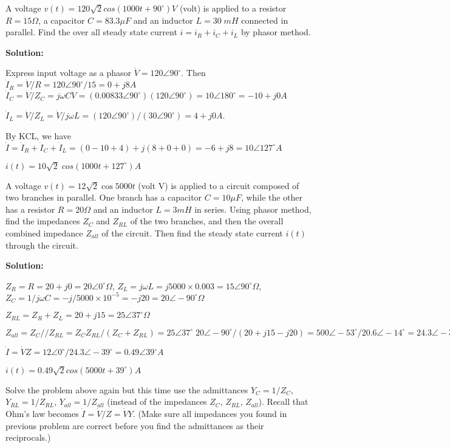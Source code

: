 \item A voltage $v(t)=120\sqrt{2} cos(1000t+90^\circ) V$ (volt) is applied to 
a resistor $R=15\Omega$, a capacitor $C=83.3\mu F$ and an inductor $L=30\; mH$ 
connected in parallel. Find the over all steady state current $i=i_R+i_C+i_L$ 
by phasor method.

{\bf Solution:}

Express input voltage as a phasor $\dot{V}=120\angle{90^\circ}$.  
Then $\dot{I}_R=\dot{V}/R=120\angle{90^\circ}/15=0+j8 A$
 $\dot{I}_C=\dot{V}/Z_C=j\omega C\dot{V}=(0.00833\angle 90^\circ)(120\angle{90^\circ})
 	=10\angle 180^\circ=-10+j0 A$

$\dot{I}_L=\dot{V}/Z_L=\dot{V}/j\omega L=(120\angle 90^\circ)/(30\angle{90^\circ})=4+j0 A$.

By KCL, we have $\dot{I}=\dot{I}_R+\dot{I}_C+\dot{I}_L=(0-10+4)+j(8+0+0)
  	=-6+j8=10\angle{127^\circ} A$

  $i(t)=10\sqrt{2}\;cos(1000t+127^\circ) A$

\item A voltage $v(t)=12\sqrt{2} \cos 5000 t$ (volt V) is applied to a circuit
composed of two branches in parallel. One branch has a capacitor $C=10\mu F$,
while the other has a resistor $R=20\Omega$ and an inductor $L=3 mH$ in series.
Using phasor method, find the impedances $Z_C$ and $Z_{RL}$ of the two branches,
and then the overall combined impedance $Z_{all}$ of the circuit. Then find
the steady state current $i(t)$ through the circuit.

{\bf Solution:}

$Z_R=R=20+j0=20\angle 0^\circ \Omega$, $Z_L=j\omega L=j5000\times 0.003
=15\angle 90^\circ \Omega$, $Z_C=1/j\omega C=-j/5000 \times 10^{-5}=-j20
=20\angle -90^\circ \Omega$

$Z_{RL}=Z_R+Z_L=20+j15=25\angle 37^\circ \Omega$

$Z_{all}=Z_C//Z_{RL}=Z_C Z_{RL}/(Z_C+Z_{RL})=25\angle 37^\circ \; 
20\angle -90^\circ/(20+j15-j20)=500\angle -53^\circ/20.6\angle -14^\circ
=24.3\angle -39^\circ=18.9-j15.3 \Omega $

$\dot{I}=\dot{V}{Z}=12\angle 0^\circ/24.3\angle -39^\circ=0.49\angle 39^\circ A$

  $i(t)=0.49\sqrt{2} cos(5000t+39^\circ) A$

\item Solve the problem above again but this time use the admittances 
$Y_C=1/Z_C$, $Y_{RL}=1/Z_{RL}$, $Y_{all}=1/Z_{all}$ (instead of the
impedances $Z_C$, $Z_{RL}$, $Z_{all}$). Recall that Ohm's law becomes
$\dot{I}=\dot{V}/Z=\dot{V}Y$. (Make sure all impedances you found in 
previous problem are correct before you find the admittances as their 
reciprocals.)

